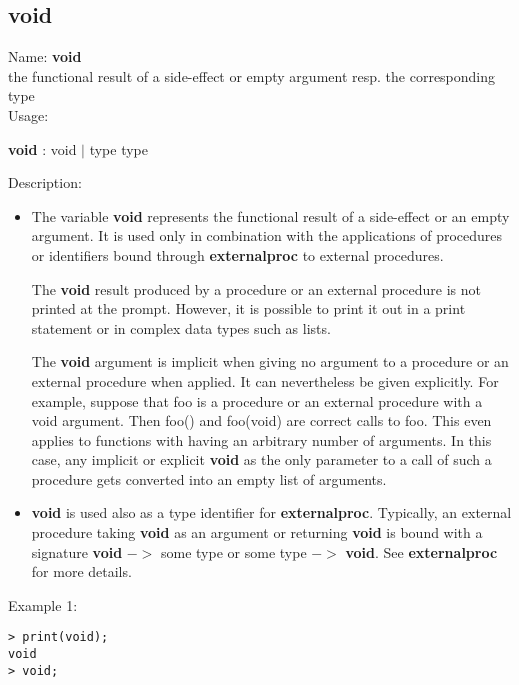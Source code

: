 \subsection{void}
\label{labvoid}
\noindent Name: \textbf{void}\\
the functional result of a side-effect or empty argument resp. the corresponding type\\
\noindent Usage: 
\begin{center}
\textbf{void} : \textsf{void} $|$ \textsf{type type}
\\ 
\end{center}
\noindent Description: \begin{itemize}

\item The variable \textbf{void} represents the functional result of a
   side-effect or an empty argument.  It is used only in combination with
   the applications of procedures or identifiers bound through
   \textbf{externalproc} to external procedures.
    
   The \textbf{void} result produced by a procedure or an external procedure
   is not printed at the prompt. However, it is possible to print it out
   in a print statement or in complex data types such as lists.
    
   The \textbf{void} argument is implicit when giving no argument to a
   procedure or an external procedure when applied. It can nevertheless be given
   explicitly.  For example, suppose that foo is a procedure or an
   external procedure with a void argument. Then foo() and foo(void) are
   correct calls to foo. This even applies to functions with having an
   arbitrary number of arguments. In this case, any implicit or explicit \textbf{void}
   as the only parameter to a call of such a procedure gets converted into 
   an empty list of arguments.

\item \textbf{void} is used also as a type identifier for
   \textbf{externalproc}. Typically, an external procedure taking \textbf{void} as an
   argument or returning \textbf{void} is bound with a signature \textbf{void} $->$
   some type or some type $->$ \textbf{void}. See \textbf{externalproc} for more
   details.
\end{itemize}
\noindent Example 1: 
\begin{center}\begin{minipage}{15cm}\begin{Verbatim}[frame=single]
> print(void);
void
> void;
\end{Verbatim}
\end{minipage}\end{center}
